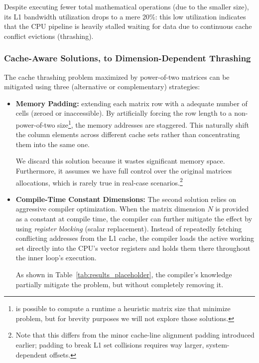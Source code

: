 Despite executing fewer total mathematical operations (due to the smaller size), its L1 bandwidth utilization drops to a mere 20\%: this low utilization indicates that the CPU pipeline is heavily stalled waiting for data due to continuous cache conflict evictions (thrashing).



\subsubsection{Cache-Aware Solutions, to Dimension-Dependent Thrashing}

The cache thrashing problem  maximized by power-of-two matrices can be mitigated using three (alternative or complementary) strategies:

\begin{itemize}
    \item \textbf{Memory Padding:} extending each matrix row with a adequate number of cells (zeroed or inaccessible).
    By artificially forcing the row length to a non-power-of-two size\footnote{is possible to compute a runtime a heuristic matrix size that minimize problem, but for brevity purposes we will not explore those solutions.}, the memory addresses are staggered. 
    This naturally shift the column elements across different cache sets rather than concentrating them into the same one. 
    
    We discard this solution because it wastes significant memory space. Furthermore, it assumes we have full control over the original matrices allocations, which is rarely true in real-case scenarios.\footnote{Note that this differs from the minor cache-line alignment padding introduced earlier; padding to break L1 set collisions requires way larger, system-dependent offsets.}

    \item \textbf{Compile-Time Constant Dimensions:} The second solution relies on aggressive compiler optimization. When the matrix dimension $N$ is provided as a constant at compile time, the compiler can further mitigate the effect by using \emph{register blocking} (scalar replacement). Instead of repeatedly fetching conflicting addresses from the L1 cache, the compiler loads the active working set directly into the CPU's vector registers and holds them there throughout the inner loop's execution. 
    
    As shown in Table~\ref{tab:results_placeholder}, the compiler's knowledge partially mitigate the problem, but without completely removing it.


\end{itemize}
